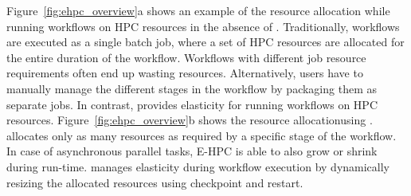 






Figure~\ref{fig:ehpc_overview}a shows an example of the resource
allocation while running workflows on HPC resources in the absence of
\systemname. Traditionally, workflows are executed as a single
batch job, where a set of HPC resources are allocated for the entire
duration of the workflow. Workflows with different job resource
requirements often end up wasting resources. Alternatively, users have
to manually manage the different stages in the workflow by packaging
them as separate jobs. In contrast, \systemname provides elasticity
for running workflows on HPC
resources. Figure~\ref{fig:ehpc_overview}b shows the resource
allocationusing \systemname. \systemname allocates only as many
resources as required by a specific stage of the
workflow. In case of asynchronous parallel tasks, E-HPC
is able to also grow or shrink during run-time. \systemname manages
elasticity during workflow execution by dynamically resizing the
allocated resources using checkpoint and restart.

\vspace{-0.3cm}
